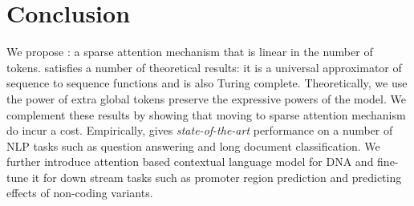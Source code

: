 \section{Conclusion}
We propose \bigb: a sparse attention mechanism that is linear in the 
number of tokens. \bigb satisfies a number of theoretical results: 
 it is a universal approximator of sequence to sequence functions and is also
Turing complete.  Theoretically,  we use the power of extra global tokens
preserve the expressive powers of the model. 
We complement these results by showing that moving to sparse attention mechanism
do incur a cost. 
Empirically, \bigb  gives  \emph{state-of-the-art} performance on a number of NLP tasks such as 
question answering and long document classification. We  further introduce attention based 
contextual language model for DNA and fine-tune it for down 
stream tasks such as  promoter region prediction and predicting effects of non-coding variants.